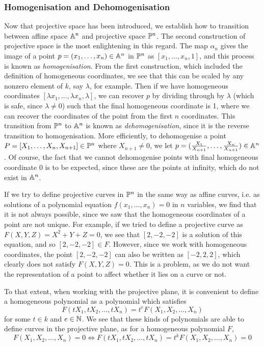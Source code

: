 \subsubsection{Homogenisation and Dehomogenisation}
Now that projective space has been introduced, we establish how to transition between affine space $\mathbb{A}^{n}$ and projective space $\mathbb{P}^{n}$.
The second construction of projective space is the most enlightening in this regard.
The map $\alpha_n$ gives the image of a point $p=(x_1,\ldots,x_n)\in\mathbb{A}^{n}$ in $\mathbb{P}^{n}$ as $[x_1,\ldots,x_n,1]$, and this process is known as \emph{homogenisation}.
From the first construction, which included the definition of homogeneous coordinates, we see that this can be scaled by any nonzero element of $k$, say $\lambda$, for example.
Then if we have homogeneous coordinates $[\lambda x_1,\ldots,\lambda x_n,\lambda]$, we can recover $p$ by dividing through by $\lambda$ (which is safe, since $\lambda\neq0$) such that the final homogeneous coordinate is 1, where we can recover the coordinates of the point from the first $n$ coordinates.
This transition from $\mathbb{P}^{n}$ to $\mathbb{A}^{n}$ is known as \emph{dehomogenisation}, since it is the reverse transition to homogenisation.
More efficiently, to dehomogenise a point $P = [X_1,\ldots,X_n,X_{n+1}] \in \mathbb{P}^{n}$ where $X_{n+1}\neq0$, we let $p = (\frac{X_1}{X_{n+1}},\ldots,\frac{X_n}{X_{n+1}})\in \mathbb{A}^{n}$.
Of course, the fact that we cannot dehomogenise points with final homogeneous coordinate 0 is to be expected, since these are the points at infinity, which do not exist in $\mathbb{A}^{n}$.

If we try to define projective curves in $\mathbb{P}^{n}$ in the same way as affine curves, i.e. as solutions of a polynomial equation $f(x_1,\ldots,x_n)=0$ in $n$ variables, we find that it is not always possible, since we saw that the homogeneous coordinates of a point are not unique.
For example, if we tried to define a projective curve as $F(X,Y,Z)=X^2+Y+Z=0$, we see that $[2,-2,-2]$ is a solution of this equation, and so $[2,-2,-2] \in F$.
However, since we work with homogeneous coordinates, the point $[2,-2,-2]$ can also be written as $[-2,2,2]$, which clearly does not satisfy $F(X,Y,Z)=0$.
This is a problem, as we do not want the representation of a point to affect whether it lies on a curve or not.

To that extent, when working with the projective plane, it is convenient to define a homogeneous polynomial as a polynomial which satisfies
$$F(tX_1,tX_2,\ldots,tX_n)=t^e F(X_1,X_2,\ldots,X_n)$$
for some $t \in k$ and $e \in \mathbb{N}$.
We see that these kinds of polynomials are able to define curves in the projective plane, as for a homogeneous polynomial $F$,
$$F(X_1,X_2,\ldots,X_n)=0 \Leftrightarrow F(tX_1,tX_2,\ldots,tX_n) = t^k F(X_1,X_2,\ldots,X_n) = 0$$

